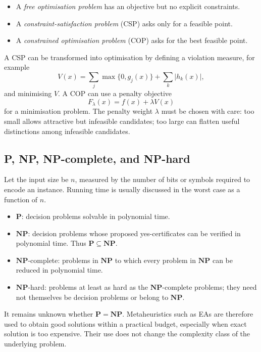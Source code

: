 \documentclass[11pt,a4paper]{article}
\begin{document}
\begin{itemize}[leftmargin=*]
  \item A \emph{free optimisation problem} has an objective but no explicit
        constraints.
  \item A \emph{constraint-satisfaction problem} (CSP) asks only for a
        feasible point.
  \item A \emph{constrained optimisation problem} (COP) asks for the best
        feasible point.
\end{itemize}

A CSP can be transformed into optimisation by defining a violation measure,
for example
\[
  V(x)=\sum_j \max\{0,g_j(x)\}
       +\sum_k |h_k(x)|,
\]
and minimising $V$.  A COP can use a penalty objective
\[
  F_\lambda(x)=f(x)+\lambda V(x)
\]
for a minimisation problem.  The penalty weight $\lambda$ must be chosen with
care: too small allows attractive but infeasible candidates; too large can
flatten useful distinctions among infeasible candidates.

\subsection{P, NP, NP-complete, and NP-hard}

Let the input size be $n$, measured by the number of bits or symbols required
to encode an instance.  Running time is usually discussed in the worst case
as a function of $n$.

\begin{itemize}[leftmargin=*]
  \item $\mathbf{P}$: decision problems solvable in polynomial time.
  \item $\mathbf{NP}$: decision problems whose proposed yes-certificates can
        be verified in polynomial time.  Thus $\mathbf{P}\subseteq\mathbf{NP}$.
  \item $\mathbf{NP}$-complete: problems in $\mathbf{NP}$ to which every
        problem in $\mathbf{NP}$ can be reduced in polynomial time.
  \item $\mathbf{NP}$-hard: problems at least as hard as the
        $\mathbf{NP}$-complete problems; they need not themselves be decision
        problems or belong to $\mathbf{NP}$.
\end{itemize}

It remains unknown whether $\mathbf{P}=\mathbf{NP}$.  Metaheuristics such as
EAs are therefore used to obtain good solutions within a practical budget,
especially when exact solution is too expensive.  Their use does not change
the complexity class of the underlying problem.
\end{document}
